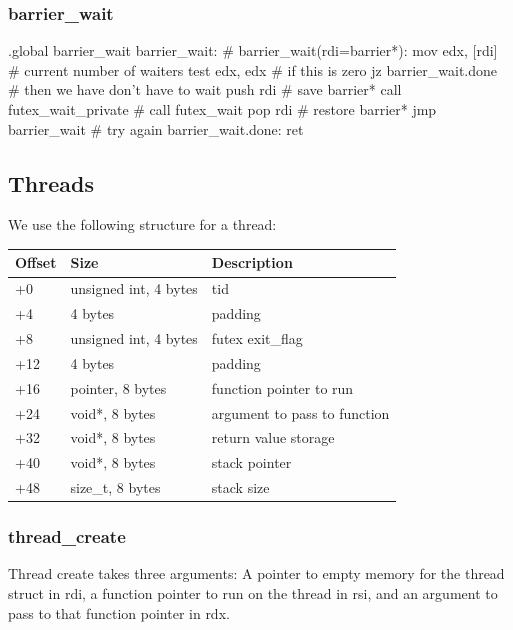 \subsubsection{barrier\_wait}

\begin{asm}
.global barrier_wait
barrier_wait:				    # barrier_wait(rdi=barrier*):
	mov	edx, [rdi]		    #   current number of waiters
	test	edx, edx		    #   if this is zero
	jz	barrier_wait.done	    #   then we have don't have to wait
	push	rdi			    #   save barrier*
	call	futex_wait_private	    #   call futex_wait
	pop	rdi			    #   restore barrier*
	jmp	barrier_wait		    #   try again
barrier_wait.done:
	ret
\end{asm}

\subsection{Threads}

We use the following structure for a thread:

\begin{table}[h]
\begin{tabular}{|l|l|l|}\hline
Offset & Size & Description \\\hline
+0   & unsigned int, 4 bytes & tid \\
+4   & 4 bytes & padding \\
+8   & unsigned int, 4 bytes & futex exit\_flag \\
+12  & 4 bytes & padding \\
+16  & pointer, 8 bytes & function pointer to run \\
+24  & void*, 8 bytes & argument to pass to function \\
+32  & void*, 8 bytes & return value storage \\
+40  & void*, 8 bytes & stack pointer \\
+48  & size\_t, 8 bytes & stack size \\\hline
\end{tabular}
\end{table}


\subsubsection{thread\_create}

Thread create takes three arguments: A pointer to empty memory for the thread
struct in rdi, a function pointer to run on the thread in rsi, and an argument
to pass to that function pointer in rdx.

